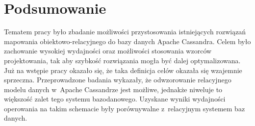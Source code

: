 
\chapter{Podsumowanie}

Tematem pracy było zbadanie możliwości przystosowania istniejących rozwiązań mapowania obiektowo-relacyjnego do bazy danych Apache Cassandra. Celem było zachowanie wysokiej wydajności oraz możliwości stosowania wzorców projektowania, tak aby szybkość rozwiązania mogła być dalej optymalizowana. Już na wstępie pracy okazało się, że taka definicja celów okazała się wzajemnie sprzeczna. Przeprowadzone badania wykazały, że odwzorowanie relacyjnego modelu danych w~Apache Cassandrze jest możliwe, jednakże niweluje to większość zalet tego systemu bazodanowego. Uzyskane wyniki wydajności operowania na takim schemacie były porównywalne z~relacyjnym systemem baz danych. 